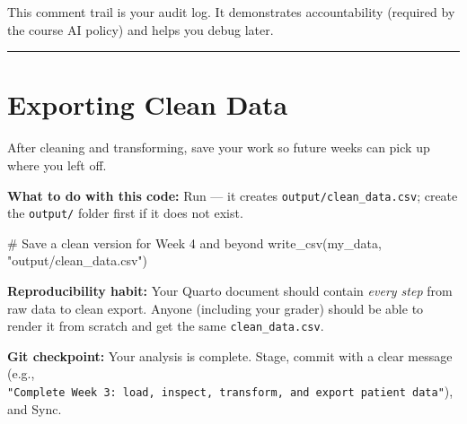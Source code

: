 \documentclass[
  letterpaper,
  DIV=11,
  numbers=noendperiod,
  oneside]{scrreprt}
\newenvironment{Shaded}{\begin{snugshade}}{\end{snugshade}}
\newcommand{\CommentTok}[1]{\textcolor[rgb]{0.37,0.37,0.37}{#1}}
\newcommand{\FunctionTok}[1]{\textcolor[rgb]{0.28,0.35,0.67}{#1}}
\newcommand{\NormalTok}[1]{\textcolor[rgb]{0.00,0.23,0.31}{#1}}
\newcommand{\StringTok}[1]{\textcolor[rgb]{0.13,0.47,0.30}{#1}}
\begin{document}
This comment trail is your audit log. It demonstrates accountability
(required by the course AI policy) and helps you debug later.

\begin{center}\rule{0.5\linewidth}{0.5pt}\end{center}

\section*{\texorpdfstring{Exporting Clean Data
}{Exporting Clean Data }}\label{exporting-clean-data}


After cleaning and transforming, save your work so future weeks can pick
up where you left off.

\textbf{What to do with this code:} Run --- it creates
\texttt{output/clean\_data.csv}; create the \texttt{output/} folder
first if it does not exist.

\begin{Shaded}
\begin{Highlighting}[numbers=left,,]
\CommentTok{\# Save a clean version for Week 4 and beyond}
\FunctionTok{write\_csv}\NormalTok{(my\_data, }\StringTok{"output/clean\_data.csv"}\NormalTok{)}
\end{Highlighting}
\end{Shaded}

\begin{tcolorbox}[enhanced jigsaw, title=\textcolor{quarto-callout-tip-color}{\faLightbulb}\hspace{0.5em}{Tip}, arc=.35mm, toptitle=1mm, colframe=quarto-callout-tip-color-frame, toprule=.15mm, leftrule=.75mm, bottomtitle=1mm, opacityback=0, bottomrule=.15mm, coltitle=black, breakable, opacitybacktitle=0.6, titlerule=0mm, colback=white, left=2mm, colbacktitle=quarto-callout-tip-color!10!white, rightrule=.15mm]

\textbf{Reproducibility habit:} Your Quarto document should contain
\emph{every step} from raw data to clean export. Anyone (including your
grader) should be able to render it from scratch and get the same
\texttt{clean\_data.csv}.

\end{tcolorbox}

\textbf{Git checkpoint:} Your analysis is complete. Stage, commit with a
clear message (e.g.,
\texttt{"Complete\ Week\ 3:\ load,\ inspect,\ transform,\ and\ export\ patient\ data"}),
and Sync.
\end{document}
